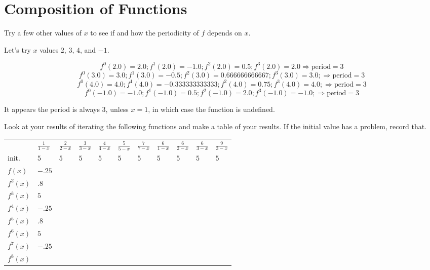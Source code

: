 \documentclass[../key.tex]{subfiles}
\begin{document}
\section{Composition of Functions}

\begin{outer_problem}
\item Try a few other values of $x$ to see if and how the periodicity of $f$ depends on $x$.
\end{outer_problem}

Let's try $x$ values $2$, $3$, $4$, and $-1$.

$$f^0 (2.0) = 2.0; f^1 (2.0) = -1.0; f^2 (2.0) = 0.5; f^3 (2.0) = 2.0 \Longrightarrow \text{period} = 3$$
$$f^0 (3.0) = 3.0; f^1 (3.0) = -0.5; f^2 (3.0) = 0.666666666667; f^3 (3.0) = 3.0; \Longrightarrow \text{period} = 3$$
$$f^0 (4.0) = 4.0; f^1 (4.0) = -0.333333333333; f^2 (4.0) = 0.75; f^3 (4.0) = 4.0; \Longrightarrow \text{period} = 3$$
$$f^0 (-1.0) = -1.0; f^1 (-1.0) = 0.5; f^2 (-1.0) = 2.0; f^3 (-1.0) = -1.0; \Longrightarrow \text{period} = 3$$

It appears the period is always $3$, unless $x=1$, in which case the function is undefined.

\begin{outer_problem}
\item Look at your results of iterating the following functions and make a table of your results. If the initial value has a problem, record that.
\end{outer_problem}


\begin{tabular}{l|llllllllll}
    \hline
    & $\frac{1}{1-x}$ & $\frac{2}{2-x}$ & $\frac{3}{3-x}$ & $\frac{4}{4-x}$ & $\frac{5}{5-x}$ & $\frac{7}{7-x}$ & $\frac{6}{1-x}$ & $\frac{6}{2-x}$ & $\frac{6}{3-x}$ & $\frac{9}{3-x}$ \\
    \rowcolor{light-gray}
    init.    & $5$   & $5$   & $5$ & $5$ & $5$ & $5$ & $5$ & $5$ & $5$ & $5$ \\
    $f(x)$   & $-.25$&       &   &   &   &   &   &   &   &   \\
    \rowcolor{light-gray}
    $f^2(x)$ & $.8$  &       &   &   &   &   &   &   &   &   \\
    $f^3(x)$ & $5$   &       &   &   &   &   &   &   &   &   \\
    \rowcolor{light-gray}
    $f^4(x)$ & $-.25$&       &   &   &   &   &   &   &   &   \\
    $f^5(x)$ & $.8$  &       &   &   &   &   &   &   &   &   \\
    \rowcolor{light-gray}
    $f^6(x)$ & $5$   &       &   &   &   &   &   &   &   &   \\
    $f^7(x)$ & $-.25$&       &   &   &   &   &   &   &   &   \\
    \rowcolor{light-gray}
    $f^8(x)$ &       &       &   &   &   &   &   &   &   &   \\ \hline
\end{tabular}
\end{document}

